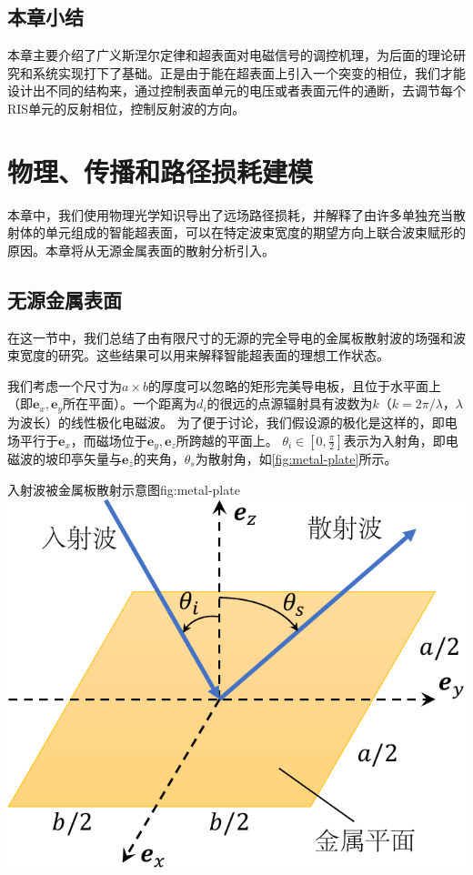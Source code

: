 \documentclass[supercite]{HustGraduPaper}
\begin{document}
\subsection{本章小结}

本章主要介绍了广义斯涅尔定律和超表面对电磁信号的调控机理，为后面的理论研究和系统实现打下了基础。正是由于能在超表面上引入一个突变的相位，我们才能设计出不同的结构来，通过控制表面单元的电压或者表面元件的通断，去调节每个RIS单元的反射相位，控制反射波的方向。

\section{物理、传播和路径损耗建模}\label{sec:modeling}

本章中，我们使用物理光学知识导出了远场路径损耗\cite{emil2019intelligent}，并解释了由许多单独充当散射体的单元组成的智能超表面，可以在特定波束宽度的期望方向上联合波束赋形的原因。本章将从无源金属表面的散射分析引入。

\subsection{无源金属表面}\label{subsec:metal-plate}

在这一节中，我们总结了由有限尺寸的无源的完全导电的金属板散射波的场强和波束宽度的研究。这些结果可以用来解释智能超表面的理想工作状态。

我们考虑一个尺寸为$a \times b$的厚度可以忽略的矩形完美导电板，且位于水平面上（即$\boldsymbol{e}_{x}, \boldsymbol{e}_{y}$所在平面）。一个距离为$d_i$的很远的点源辐射具有波数为$k$（$k = 2\pi / \lambda$，$\lambda$为波长）的线性极化电磁波。
为了便于讨论，我们假设源的极化是这样的，即电场平行于$\boldsymbol{e}_{x}$，而磁场位于$\boldsymbol{e}_{y}, \boldsymbol{e}_{z}$所跨越的平面上。
$\theta_{i} \in\left[0, \frac{\pi}{2}\right]$表示为入射角，即电磁波的坡印亭矢量与$\boldsymbol{e}_{z}$的夹角，$\theta_{s}$为散射角，如\autoref{fig:metal-plate}所示。

\begin{generalfig}[htb]{入射波被金属板散射示意图}{fig:metal-plate}
	\includegraphics[width=0.5\linewidth]{Figures/metal-plate.pdf}
\end{generalfig}
\end{document}
